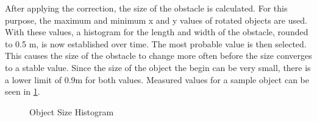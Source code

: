 \documentclass[11pt,oneside,openright]{mpreport}
\begin{document}

After applying the correction, the size of the obstacle is calculated. For this purpose, the maximum and minimum x and y values of
rotated objects are used. With these values, a histogram for the length and width of the obstacle, rounded to 0.5 m, is now established over time. 
The most probable value is then selected. This causes the size of the obstacle to change more often before the size converges to a stable value.
Since the size of the object the begin can be very small, there is a lower limit of 0.9m for both values. Measured values for a sample object can be seen in \cref{obst_hist}.
\begin{figure}[!ht]
\begin{center}
\caption{Object Size Histogram}
\label{obst_hist}
\end{center}
\end{figure}
\end{document}
